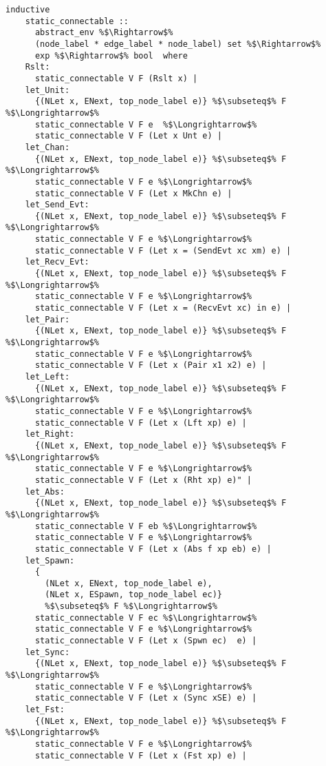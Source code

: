 \documentclass{article}
\begin{document}
\begin{lstlisting}[style=codestyle1, escapechar=\%]
  inductive
    static_connectable ::
      abstract_env %$\Rightarrow$%
      (node_label * edge_label * node_label) set %$\Rightarrow$%
      exp %$\Rightarrow$% bool  where
    Rslt:
      static_connectable V F (Rslt x) |
    let_Unit:
      {(NLet x, ENext, top_node_label e)} %$\subseteq$% F %$\Longrightarrow$%
      static_connectable V F e  %$\Longrightarrow$%
      static_connectable V F (Let x Unt e) |
    let_Chan:
      {(NLet x, ENext, top_node_label e)} %$\subseteq$% F %$\Longrightarrow$%
      static_connectable V F e %$\Longrightarrow$%
      static_connectable V F (Let x MkChn e) |
    let_Send_Evt:
      {(NLet x, ENext, top_node_label e)} %$\subseteq$% F %$\Longrightarrow$%
      static_connectable V F e %$\Longrightarrow$%
      static_connectable V F (Let x = (SendEvt xc xm) e) |
    let_Recv_Evt:
      {(NLet x, ENext, top_node_label e)} %$\subseteq$% F %$\Longrightarrow$%
      static_connectable V F e %$\Longrightarrow$%
      static_connectable V F (Let x = (RecvEvt xc) in e) |
    let_Pair:
      {(NLet x, ENext, top_node_label e)} %$\subseteq$% F %$\Longrightarrow$%
      static_connectable V F e %$\Longrightarrow$%
      static_connectable V F (Let x (Pair x1 x2) e) |
    let_Left:
      {(NLet x, ENext, top_node_label e)} %$\subseteq$% F %$\Longrightarrow$%
      static_connectable V F e %$\Longrightarrow$%
      static_connectable V F (Let x (Lft xp) e) |
    let_Right:
      {(NLet x, ENext, top_node_label e)} %$\subseteq$% F %$\Longrightarrow$%
      static_connectable V F e %$\Longrightarrow$%
      static_connectable V F (Let x (Rht xp) e)" |
    let_Abs:
      {(NLet x, ENext, top_node_label e)} %$\subseteq$% F %$\Longrightarrow$%
      static_connectable V F eb %$\Longrightarrow$%
      static_connectable V F e %$\Longrightarrow$%
      static_connectable V F (Let x (Abs f xp eb) e) |
    let_Spawn:
      {
        (NLet x, ENext, top_node_label e),
        (NLet x, ESpawn, top_node_label ec)}
        %$\subseteq$% F %$\Longrightarrow$%
      static_connectable V F ec %$\Longrightarrow$%
      static_connectable V F e %$\Longrightarrow$%
      static_connectable V F (Let x (Spwn ec)  e) |
    let_Sync:
      {(NLet x, ENext, top_node_label e)} %$\subseteq$% F %$\Longrightarrow$%
      static_connectable V F e %$\Longrightarrow$%
      static_connectable V F (Let x (Sync xSE) e) |
    let_Fst:
      {(NLet x, ENext, top_node_label e)} %$\subseteq$% F %$\Longrightarrow$%
      static_connectable V F e %$\Longrightarrow$%
      static_connectable V F (Let x (Fst xp) e) |

\end{lstlisting}
\end{document}

